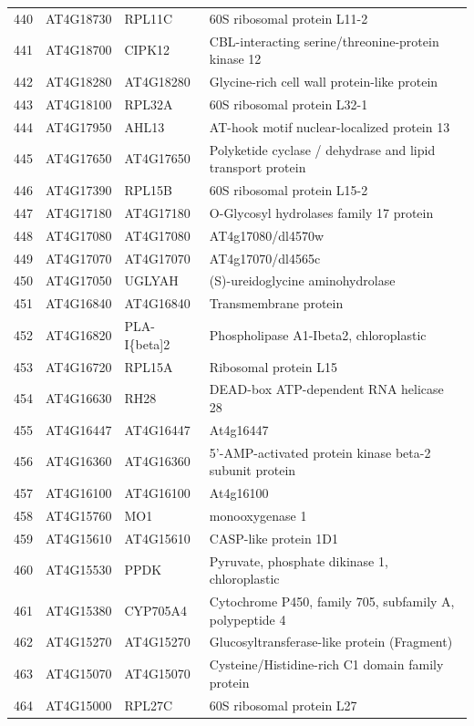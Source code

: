 \documentclass[11pt]{article}
\begin{document}
\begin{center}
\begin{tabular}{rlll}
440 & AT4G18730 & RPL11C & 60S ribosomal protein L11-2\\
441 & AT4G18700 & CIPK12 & CBL-interacting serine/threonine-protein kinase 12\\
442 & AT4G18280 & AT4G18280 & Glycine-rich cell wall protein-like protein\\
443 & AT4G18100 & RPL32A & 60S ribosomal protein L32-1\\
444 & AT4G17950 & AHL13 & AT-hook motif nuclear-localized protein 13\\
445 & AT4G17650 & AT4G17650 & Polyketide cyclase / dehydrase and lipid transport protein\\
446 & AT4G17390 & RPL15B & 60S ribosomal protein L15-2\\
447 & AT4G17180 & AT4G17180 & O-Glycosyl hydrolases family 17 protein\\
448 & AT4G17080 & AT4G17080 & AT4g17080/dl4570w\\
449 & AT4G17070 & AT4G17070 & AT4g17070/dl4565c\\
450 & AT4G17050 & UGLYAH & (S)-ureidoglycine aminohydrolase\\
451 & AT4G16840 & AT4G16840 & Transmembrane protein\\
452 & AT4G16820 & PLA-I\{beta]2 & Phospholipase A1-Ibeta2, chloroplastic\\
453 & AT4G16720 & RPL15A & Ribosomal protein L15\\
454 & AT4G16630 & RH28 & DEAD-box ATP-dependent RNA helicase 28\\
455 & AT4G16447 & AT4G16447 & At4g16447\\
456 & AT4G16360 & AT4G16360 & 5'-AMP-activated protein kinase beta-2 subunit protein\\
457 & AT4G16100 & AT4G16100 & At4g16100\\
458 & AT4G15760 & MO1 & monooxygenase 1\\
459 & AT4G15610 & AT4G15610 & CASP-like protein 1D1\\
460 & AT4G15530 & PPDK & Pyruvate, phosphate dikinase 1, chloroplastic\\
461 & AT4G15380 & CYP705A4 & Cytochrome P450, family 705, subfamily A, polypeptide 4\\
462 & AT4G15270 & AT4G15270 & Glucosyltransferase-like protein (Fragment)\\
463 & AT4G15070 & AT4G15070 & Cysteine/Histidine-rich C1 domain family protein\\
464 & AT4G15000 & RPL27C & 60S ribosomal protein L27\\

\end{tabular}
\end{center}
\end{document}
